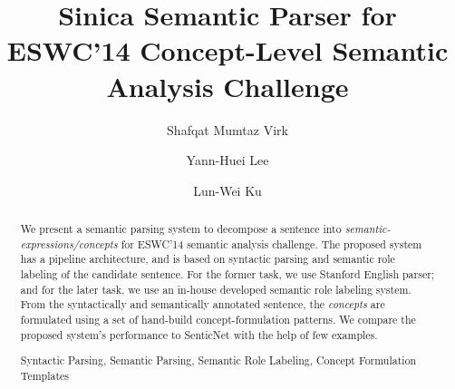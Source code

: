 \documentclass[runningheads,a4paper]{llncs}
\newcommand{\keywords}[1]{\par\addvspace\baselineskip
\noindent\keywordname\enspace\ignorespaces#1}
\begin{document}
\mainmatter  %

\title{Sinica Semantic Parser for ESWC'14 Concept-Level Semantic Analysis Challenge }


%
%
\author{Shafqat Mumtaz Virk%
\and Yann-Huei Lee\and Lun-Wei Ku}
%


%
%

\maketitle



\begin{abstract}
We present a semantic parsing system to decompose a sentence into \textit{semantic-expressions/concepts} for ESWC'14 semantic analysis challenge. The proposed system has a pipeline architecture, and is based on syntactic parsing and semantic role labeling of the candidate sentence. For the former task, we use Stanford English parser; and for the later task, we use an in-house developed semantic role labeling system. From the syntactically and semantically annotated sentence, the \textit{concepts} are formulated using a set of hand-build concept-formulation patterns. We compare the proposed system's performance to SenticNet with the help of few examples.
\keywords{Syntactic Parsing, Semantic Parsing, Semantic Role Labeling, Concept Formulation Templates}                 
\end{abstract}
\end{document}
